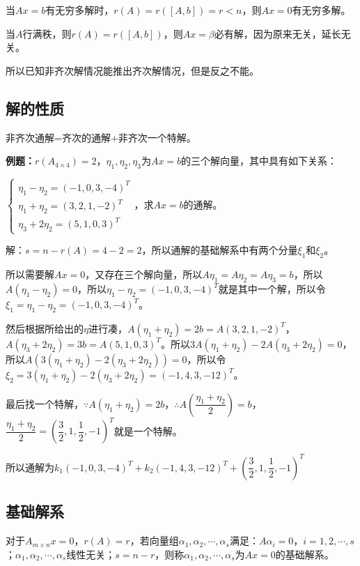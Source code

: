 当$Ax=b$有无穷多解时，$r(A)=r([A,b])=r<n$，则$Ax=0$有无穷多解。

当$A$行满秩，则$r(A)=r([A,b])$，则$Ax=\beta$必有解，因为原来无关，延长无关。

所以已知非齐次解情况能推出齐次解情况，但是反之不能。

\subsection{解的性质}

非齐次通解=齐次的通解+非齐次一个特解。

\textbf{例题：}$r(A_{4\times4})=2$，$\eta_1,\eta_2,\eta_3$为$Ax=b$的三个解向量，其中具有如下关系：

$\left\{\begin{array}{l}
    \eta_1-\eta_2=(-1,0,3,-4)^T \\
    \eta_1+\eta_2=(3,2,1,-2)^T \\
    \eta_3+2\eta_2=(5,1,0,3)^T
\end{array}\right.$，求$Ax=b$的通解。

解：$s=n-r(A)=4-2=2$，所以通解的基础解系中有两个分量$\xi_1$和$\xi_2$。

所以需要解$Ax=0$，又存在三个解向量，所以$A\eta_1=A\eta_2=A\eta_3=b$，所以$A(\eta_1-\eta_2)=0$，所以$\eta_1-\eta_2=(-1,0,3,-4)^T$就是其中一个解，所以令$\xi_1=\eta_1-\eta_2=(-1,0,3,-4)^T$。

然后根据所给出的$\eta$进行凑，$A(\eta_1+\eta_2)=2b=A(3,2,1,-2)^T$，$A(\eta_3+2\eta_2)=3b=A(5,1,0,3)^T$。所以$3A(\eta_1+\eta_2)-2A(\eta_3+2\eta_2)=0$，所以$A(3(\eta_1+\eta_2)-2(\eta_3+2\eta_2))=0$，所以令$\xi_2=3(\eta_1+\eta_2)-2(\eta_3+2\eta_2)=(-1,4,3,-12)^T$。

最后找一个特解，$\because A(\eta_1+\eta_2)=2b$，$\therefore A\left(\dfrac{\eta_1+\eta_2}{2}\right)=b$，$\dfrac{\eta_1+\eta_2}{2}=\left(\dfrac{3}{2},1,\dfrac{1}{2},-1\right)^T$就是一个特解。

所以通解为$k_1(-1,0,3,-4)^T+k_2(-1,4,3,-12)^T+\left(\dfrac{3}{2},1,\dfrac{1}{2},-1\right)^T$

\subsection{基础解系}

对于$A_{m\times n}x=0$，$r(A)=r$，若向量组$\alpha_1,\alpha_2,\cdots,\alpha_s$满足：$A\alpha_i=0$，$i=1,2,\cdots,s$；$\alpha_1,\alpha_2,\cdots,\alpha_s$线性无关；$s=n-r$，则称$\alpha_1,\alpha_2,\cdots,\alpha_s$为$Ax=0$的基础解系。

